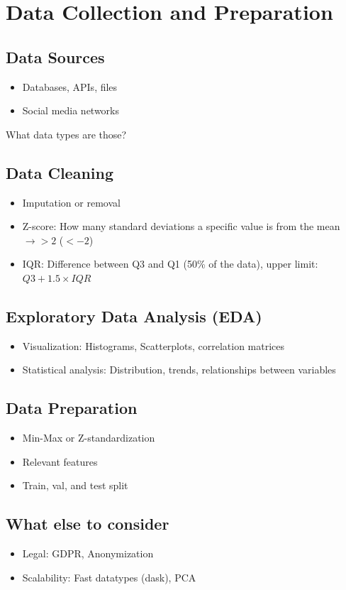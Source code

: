 \documentclass[english, threecolumn]{latex4ei/latex4ei_sheet}
\begin{document}
\section{Data Collection and Preparation}
\begin{sectionbox}
    \subsection{Data Sources}
    \begin{itemize}
        \item Databases, APIs, files
        \item Social media networks
    \end{itemize}
    What data types are those?
    
    \subsection{Data Cleaning}
    \begin{itemize}
        \item Imputation or removal
        \item Z-score: How many standard deviations a specific value is from the mean $\rightarrow > 2$ ($< -2$)
        \item IQR: Difference between Q3 and Q1 (50\% of the data), upper limit: $Q3 + 1.5 \times IQR$
    \end{itemize}
    
    \subsection{Exploratory Data Analysis (EDA)}
    \begin{itemize}
        \item Visualization: Histograms, Scatterplots, correlation matrices
        \item Statistical analysis: Distribution, trends, relationships between variables
    \end{itemize}
    
    \subsection{Data Preparation}
    \begin{itemize}
        \item Min-Max or Z-standardization
        \item Relevant features
        \item Train, val, and test split
    \end{itemize}

    \subsection{What else to consider}
    \begin{itemize}
        \item Legal: GDPR, Anonymization
        \item Scalability: Fast datatypes (dask), PCA
    \end{itemize}
\end{sectionbox}
\end{document}
